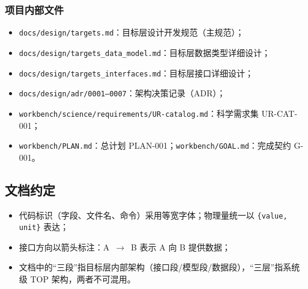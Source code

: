 \subsubsection{项目内部文件}
\begin{itemize}
  \item \texttt{docs/design/targets.md}：目标层设计开发规范（主规范）；
  \item \texttt{docs/design/targets\_data\_model.md}：目标层数据类型详细设计；
  \item \texttt{docs/design/targets\_interfaces.md}：目标层接口详细设计；
  \item \texttt{docs/design/adr/0001--0007}：架构决策记录（ADR）；
  \item \texttt{workbench/science/requirements/UR-catalog.md}：科学需求集 UR-CAT-001；
  \item \texttt{workbench/PLAN.md}：总计划 PLAN-001；\texttt{workbench/GOAL.md}：完成契约 G-001。
\end{itemize}

\subsection{文档约定}
\begin{itemize}
  \item 代码标识（字段、文件名、命令）采用等宽字体；物理量统一以 \texttt{\{value, unit\}} 表达；
  \item 接口方向以箭头标注：A~$\rightarrow$~B 表示 A 向 B 提供数据；
  \item 文档中的“三段”指目标层内部架构（接口段/模型段/数据段），“三层”指系统级 TOP 架构，两者不可混用。
\end{itemize}
